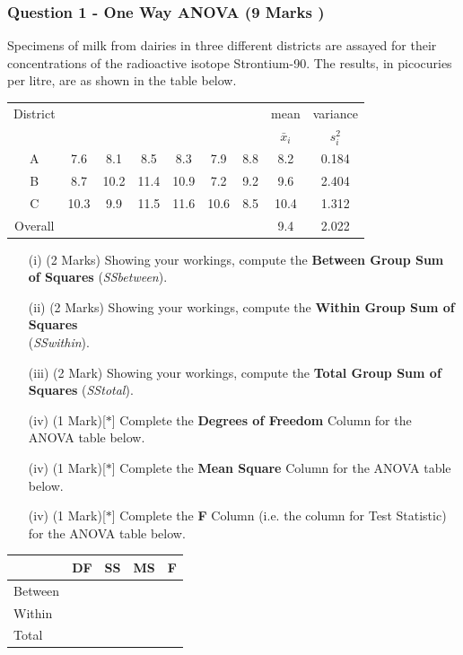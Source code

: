 \documentclass[a4paper,12pt]{article}
\begin{document}
\subsubsection*{Question 1 - One Way ANOVA (9 Marks )}
Specimens of milk from dairies in three different districts are assayed for their concentrations of the radioactive isotope Strontium-90. 
The results, in picocuries per litre, are as shown in the table below.

{
	\Large
	\begin{center}
		\begin{tabular}{|c|cccccc|c|c|}
			\hline  
			District & &&&&& & mean & variance \\  
			&  &&&&&& $\bar{x}_i$ & $s^2_{i}$ \\  
			\hline \hline
			A	&	7.6	&	8.1	&	8.5	&	8.3	&	7.9	&	8.8
			&	8.2	&	0.184	\\ \hline
			B	&	8.7	&	10.2	&	11.4	&	10.9	&	7.2	&	9.2
			&	9.6	&	2.404	\\ \hline
			C	&	10.3	&	9.9	&	11.5	&	11.6	&	10.6	&	8.5
			&	10.4	&	1.312	\\ \hline \hline
			Overall & &&&&&&	9.4	&	2.022 \\ \hline	
			
		\end{tabular} 
	\end{center}
}
\bigskip
\begin{itemize}
	\item[(i)] (2 Marks) Showing your workings, compute the \textbf{Between Group Sum of Squares} (\textit{SSbetween}).
	\item[(ii)] (2 Marks) Showing your workings, compute the \textbf{Within Group Sum of Squares}\\ (\textit{SSwithin}).
	\item[(iii)] (2 Mark) Showing your workings, compute the \textbf{Total Group Sum of Squares} (\textit{SStotal}).
	\item[(iv)] (1 Mark)[$\ast$] Complete the \textbf{Degrees of Freedom} Column for the ANOVA table below.
	\item[(iv)] (1 Mark)[$\ast$] Complete the \textbf{Mean Square} Column for the ANOVA table below.
	\item[(iv)] (1 Mark)[$\ast$] Complete the \textbf{F} Column (i.e. the column for Test Statistic) for the ANOVA table below.
\end{itemize}
\bigskip
{
	\LARGE
	\begin{center}
		\begin{tabular}{|l||c|c|c|c|}
			\hline \phantom{makespace} & DF & SS & MS & F \\ \hline
			\hline Between & \phantom{makespa} &  &  &  \\ 
			\hline Within &  &\phantom{makespace}  &  &  \\ \hline
			\hline Total &  \phantom{makespace} &  &\phantom{makespace}  & \phantom{makespace} \\ 
			\hline 
		\end{tabular} 
	\end{center}
}
%
\end{document}
